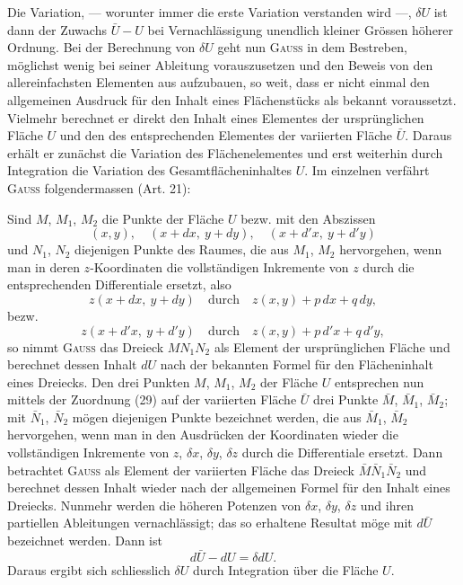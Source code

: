 Die Variation, — worunter immer die erste Variation verstanden wird —,
$\delta U$ ist dann der Zuwachs $\bar U-U$ bei Vernachlässigung unendlich kleiner Grössen
höherer Ordnung. Bei der Berechnung von $\delta U$ geht nun \textsc{Gauss} in dem Bestreben,
möglichst wenig bei seiner Ableitung vorauszusetzen und den Beweis
von den allereinfachsten Elementen aus aufzubauen, so weit, dass er nicht
einmal den allgemeinen Ausdruck für den Inhalt eines Flächenstücks als bekannt
voraussetzt. Vielmehr berechnet er direkt den Inhalt eines Elementes
der ursprünglichen Fläche $U$ und den des entsprechenden Elementes der
variierten Fläche $\bar U$. Daraus erhält er zunächst die Variation des Flächenelementes
und erst weiterhin durch Integration die Variation des Gesamtflächeninhaltes
$U$. Im einzelnen verfährt \textsc{Gauss} folgendermassen (Art. 21):
\par\clearpage{}
\noindent\hspace*{\parindent}Sind $M$, $M_1$, $M_2$ die Punkte der Fläche $U$ bezw. mit den Abszissen
\[
(x,y),\quad (x+dx,\ y+dy),\quad (x+d'x,\ y+d'y)
\]
und $N_1$, $N_2$ diejenigen Punkte des Raumes, die aus $M_1$, $M_2$ hervorgehen, wenn
man in deren $z$-Koordinaten die vollständigen Inkremente von $z$ durch die
entsprechenden Differentiale ersetzt, also
\[
z(x+dx,\ y+dy)\quad\text{durch}\quad z(x,y)+p\,dx+q\,dy,
\]
bezw.
\[
z(x+d'x,\ y+d'y)\quad\text{durch}\quad z(x,y)+p\,d'x+q\,d'y,
\]
so nimmt \textsc{Gauss} das Dreieck $MN_1N_2$ als Element der ursprünglichen Fläche
und berechnet dessen Inhalt $dU$ nach der bekannten Formel für den Flächeninhalt
eines Dreiecks. Den drei Punkten $M$, $M_1$, $M_2$ der Fläche $U$ entsprechen
nun mittels der Zuordnung (29) auf der variierten Fläche $\bar U$ drei Punkte
$\bar M$, $\bar M_1$, $\bar M_2$; mit $\bar N_1$, $\bar N_2$ mögen diejenigen Punkte bezeichnet werden, die
aus $\bar M_1$, $\bar M_2$ hervorgehen, wenn man in den Ausdrücken der Koordinaten
wieder die vollständigen Inkremente von $z$, $\delta x$, $\delta y$, $\delta z$ durch die Differentiale
ersetzt. Dann betrachtet \textsc{Gauss} als Element der variierten Fläche das Dreieck
$\bar M\bar N_1\bar N_2$ und berechnet dessen Inhalt wieder nach der allgemeinen Formel
für den Inhalt eines Dreiecks. Nunmehr werden die höheren Potenzen von
$\delta x$, $\delta y$, $\delta z$ und ihren partiellen Ableitungen vernachlässigt; das so erhaltene
Resultat möge mit $d\bar U$ bezeichnet werden. Dann ist
\[
d\bar U-dU=\delta dU.
\]
Daraus ergibt sich schliesslich $\delta U$ durch Integration über die Fläche $U$.


